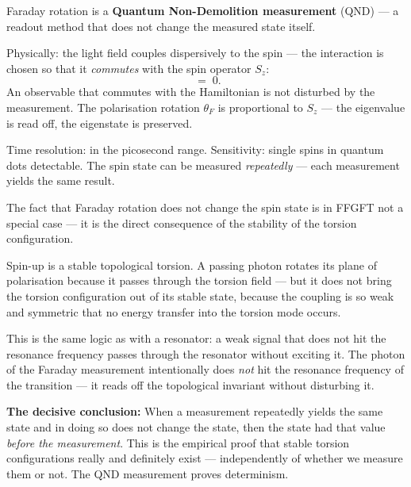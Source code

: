 \begin{keyresult}
Faraday rotation is a
\textbf{Quantum Non-Demolition measurement} (QND) ---
a readout method that does not change the measured state itself.

Physically: the light field couples dispersively to the spin ---
the interaction is chosen so that it \emph{commutes}
with the spin operator $S_z$:
\begin{equation}
  [H_\text{Faraday},\; S_z] \;=\; 0.
\end{equation}
An observable that commutes with the Hamiltonian
is not disturbed by the measurement.
The polarisation rotation $\theta_F$ is proportional to $S_z$
--- the eigenvalue is read off, the eigenstate is preserved.

Time resolution: in the picosecond range.
Sensitivity: single spins in quantum dots detectable.
The spin state can be measured \emph{repeatedly} ---
each measurement yields the same result.
\end{keyresult}

\begin{foundation}
The fact that Faraday rotation does not change the spin state
is in FFGFT not a special case ---
it is the direct consequence of the stability of the torsion configuration.

Spin-up is a stable topological torsion.
A passing photon rotates its plane of polarisation
because it passes through the torsion field --- but it does not
bring the torsion configuration out of its stable state,
because the coupling is so weak and symmetric
that no energy transfer into the torsion mode occurs.

This is the same logic as with a resonator:
a weak signal that does not hit the resonance frequency
passes through the resonator without exciting it.
The photon of the Faraday measurement intentionally
does \emph{not} hit the resonance frequency of the transition ---
it reads off the topological invariant without disturbing it.

\textbf{The decisive conclusion:}
When a measurement repeatedly yields the same state
and in doing so does not change the state,
then the state had that value \emph{before the measurement}.
This is the empirical proof that stable
torsion configurations really and definitely exist ---
independently of whether we measure them or not.
The QND measurement proves determinism.
\end{foundation}

